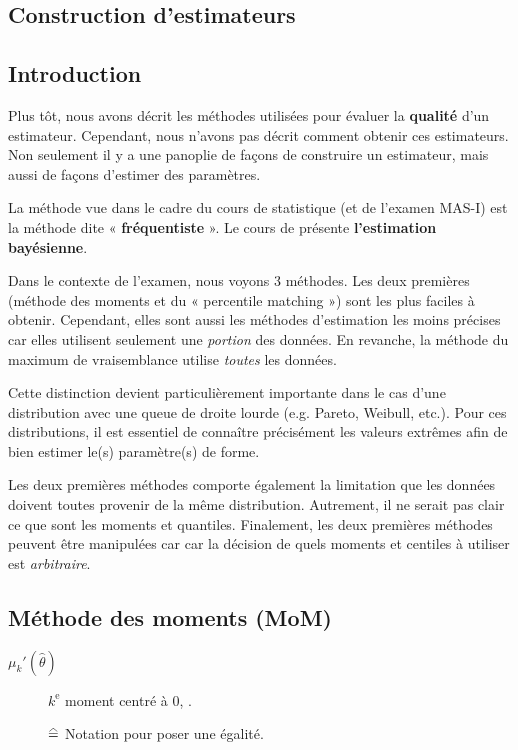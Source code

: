 \documentclass[french]{article}
\begin{document}
\begin{multicols*}{2}
\columnbreak
\section{Construction d'estimateurs}
\subsection{Introduction}
\begin{rappel_enhanced}[Contexte]
Plus tôt, nous avons décrit les méthodes utilisées pour évaluer la \textbf{qualité} d'un estimateur. Cependant, nous n'avons pas décrit comment obtenir ces estimateurs. Non seulement il y a une panoplie de façons de construire un estimateur, mais aussi de façons d'estimer des paramètres.

\bigskip

La méthode vue dans le cadre du cours de statistique (et de l'examen MAS-I) est la méthode dite « \textbf{fréquentiste} ». Le cours de  présente \textbf{l'estimation bayésienne}.
\end{rappel_enhanced}


Dans le contexte de l'examen, nous voyons 3 méthodes. Les deux premières (méthode des moments et du « percentile matching ») sont les plus faciles à obtenir. Cependant, elles sont aussi les méthodes d'estimation les moins précises car elles utilisent seulement une \textit{portion} des données. En revanche, la méthode du maximum de vraisemblance utilise \textit{toutes} les données.	

\bigskip

Cette distinction devient particulièrement importante dans le cas d'une distribution avec une queue de droite lourde (e.g. Pareto, Weibull, etc.). Pour ces distributions, il est essentiel de connaître  précisément les valeurs extrêmes afin de bien estimer le(s) paramètre(s) de forme.	

\bigskip

Les deux premières méthodes comporte également la limitation que les données doivent toutes provenir de la même distribution. Autrement, il ne serait pas clair ce que sont les moments et quantiles. Finalement, les deux premières méthodes peuvent être manipulées car car la décision de quels moments et centiles à utiliser est \textit{arbitraire}.



\columnbreak
\subsection{Méthode des moments (MoM)}
\begin{distributions}[Terminologie]
\begin{description}
	\item[$\mu_{k}'(\hat{\theta})$]	$k^{\text{e}}$ moment centré à 0, .
	\item[]	$\equalhat$	Notation pour poser une égalité.
\end{description}
\end{distributions}



\end{multicols*}
\end{document}
